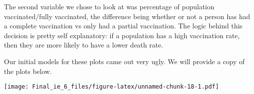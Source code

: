 \documentclass[
  12pt,
]{article}
\newenvironment{Shaded}{\begin{snugshade}}{\end{snugshade}}
\newcommand{\AttributeTok}[1]{\textcolor[rgb]{0.77,0.63,0.00}{#1}}
\newcommand{\FunctionTok}[1]{\textcolor[rgb]{0.00,0.00,0.00}{#1}}
\newcommand{\NormalTok}[1]{#1}
\newcommand{\OtherTok}[1]{\textcolor[rgb]{0.56,0.35,0.01}{#1}}
\newcommand{\SpecialCharTok}[1]{\textcolor[rgb]{0.00,0.00,0.00}{#1}}
\begin{document}
The second variable we chose to look at was percentage of population
vaccinated/fully vaccinated, the difference being whether or not a
person has had a complete vaccination vs only had a partial vaccination.
The logic behind this decision is pretty self explanatory: if a
population has a high vaccination rate, then they are more likely to
have a lower death rate.

\begin{Shaded}
\end{Shaded}

Our initial models for these plots came out very ugly. We will provide a
copy of the plots below.

\begin{Shaded}
\end{Shaded}

\texttt{[image: Final\_ie\_6\_files/figure-latex/unnamed-chunk-18-1.pdf]}

\begin{Shaded}
\end{Shaded}
\end{document}

